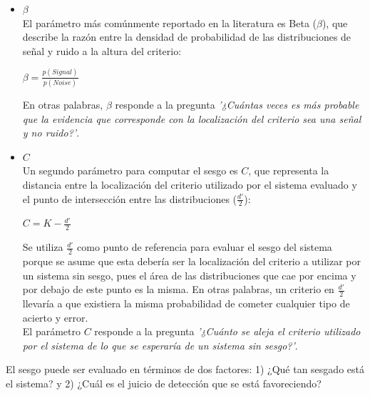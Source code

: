 \begin{itemize}
\begin{itemize}
\item \underline{$\beta$}\\

El parámetro más comúnmente reportado en la literatura es Beta ($\beta$), que describe la razón entre la densidad de probabilidad de las distribuciones de señal y ruido a la altura del criterio: \\

\begin{center}
$\beta = \frac{p(Signal)}{p(Noise)}$ \\
\end{center}

En otras palabras, $\beta$ responde a la pregunta \textit{'¿Cuántas veces es más probable que la evidencia que corresponde con la localización del criterio sea una señal y no ruido?'}.

\item \underline{$C$}\\

Un segundo parámetro para computar el sesgo es $C$, que representa la distancia entre la localización del criterio utilizado por el sistema evaluado y el punto de intersección entre las distribuciones ($\frac{d'}{2}$):\\

\begin{center}
$C =  K - \frac{d'}{2}$ \\
\end{center}

Se utiliza $\frac{d'}{2}$ como punto de referencia para evaluar el sesgo del sistema porque se asume que esta debería ser la localización del criterio a utilizar por un sistema sin sesgo, pues el área de las distribuciones que cae por encima y por debajo de este punto es la misma. En otras palabras, un criterio en $\frac{d'}{2}$ llevaría a que existiera la misma probabilidad de cometer cualquier tipo de acierto y error.\\

El parámetro $C$ responde a la pregunta \textit{'¿Cuánto se aleja el criterio utilizado por el sistema de lo que se esperaría de un sistema sin sesgo?'}.\\

\end{itemize}

El sesgo puede ser evaluado en términos de dos factores: 1) ¿Qué tan sesgado está el sistema? y 2) ¿Cuál es el juicio de detección que se está favoreciendo?\\


\end{itemize}
